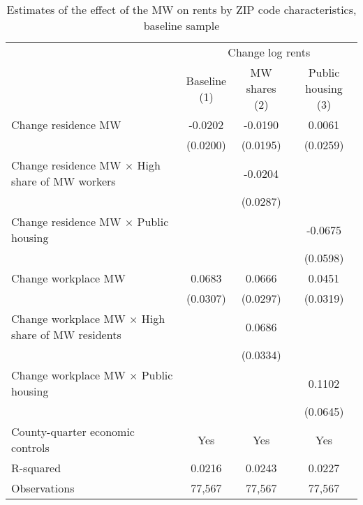 \begin{table}[hbt!] \centering
    \caption{Estimates of the effect of the MW on rents by ZIP code characteristics, baseline sample}
    \label{tab:heterogeneity}
    \begin{tabular}{@{}lccc@{}}
        \toprule
            & \multicolumn{3}{c}{Change log rents}                                                  \\ \cmidrule(l){2-4} 
            & \shortstack{Baseline\\(1)} 
            & \shortstack{MW shares\\(2)}                                             
            & \shortstack{Public housing\\(3)}                                                      \\ \midrule
        Change residence MW                                     &  -0.0202   &  -0.0190  &  0.0061   \\
                                                                & (0.0200)  & (0.0195) & (0.0259)  \\
        Change residence MW $\times$ High share of MW workers   &        &  -0.0204  &        \\
                                                                &        & (0.0287) &        \\
        Change residence MW $\times$ Public housing             &        &       &  -0.0675   \\
                                                                &        &       & (0.0598)  \\
        Change workplace MW                                     &  0.0683   &  0.0666  &  0.0451   \\
                                                                & (0.0307)  & (0.0297) & (0.0319)  \\
        Change workplace MW $\times$ High share of MW residents &        &  0.0686  &        \\
                                                                &        & (0.0334) &        \\
        Change workplace MW $\times$ Public housing             &        &       &  0.1102   \\
                                                                &        &       & (0.0645)  \\
        County-quarter economic controls                        &  Yes   &  Yes  &   Yes  \\
        R-squared                                               &  0.0216   &  0.0243  &   0.0227  \\
        Observations                                            &  77,567  &  77,567 &   77,567 \\ \bottomrule
    \end{tabular}


\end{table}
